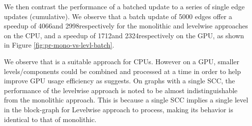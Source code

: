 We then contrast the performance of a batched update to a series of single edge updates (cumulative). We observe that a batch update of 5000 edges offer a speedup of 4066\x and 2998\x respectively for the monolithic and levelwise approaches on the CPU, and a speedup of 1712\x and 2324\x respectively on the GPU, as shown in Figure \ref{fig:pr-mono-vs-levl-batch}.

We observe that \levelwisePR{} is a suitable approach for CPUs. However on a GPU, smaller levels/components could be combined and processed at a time in order to help improve GPU usage efficiency as \monolithicPR suggests.
On graphs with a single SCC, the performance of the levelwise approach is noted to be almost indistinguishable from the monolithic approach. This is because a single SCC implies a single level in the block-graph for Levelwise approach to process, making its behavior is identical to that of monolithic.







